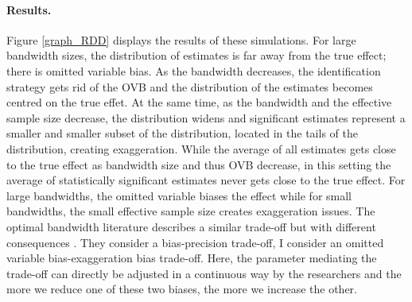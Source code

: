 \documentclass[usletter, 12pt]{article}
\begin{document}
			\paragraph{Results.}  Figure \ref{graph_RDD} displays the results of these simulations.
			For large bandwidth sizes, the distribution of estimates is far away from the true effect; there is omitted variable bias. As the bandwidth decreases, the identification strategy gets rid of the OVB and the distribution of the estimates becomes centred on the true effet. At the same time, as the bandwidth and the effective sample size decrease, the distribution widens and significant estimates represent a smaller and smaller subset of the distribution, located in the tails of the distribution, creating exaggeration. %
			While the average of all estimates gets close to the true effect as bandwidth size and thus OVB decrease, in this setting the average of statistically significant estimates never gets close to the true effect. For large bandwidths, the omitted variable biases the effect while for small bandwidths, the small effective sample size creates exaggeration issues. 
			The optimal bandwidth literature describes a similar trade-off but with different consequences \citep{imbens_optimal_2012}. They consider a bias-precision trade-off, I consider an omitted variable bias-exaggeration bias trade-off. Here, the parameter mediating the trade-off can directly be adjusted in a continuous way by the researchers and the more we reduce one of these two biases, the more we increase the other. %
        
\end{document}

